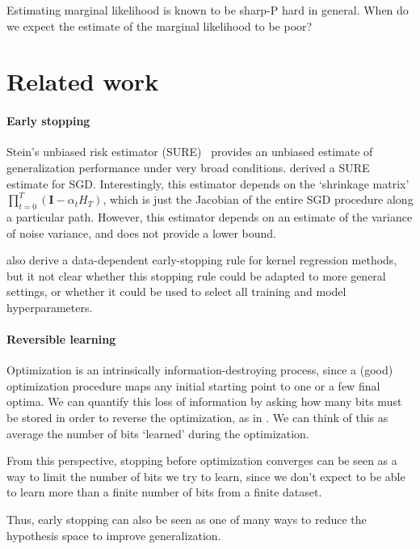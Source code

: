 \documentclass[]{article}
\newcommand{\vI}{\mathbf{I}}
\newcommand{\stepsize}{\alpha}
\begin{document}
Estimating marginal likelihood is known to be sharp-P hard in general.
When do we expect the estimate of the marginal likelihood to be poor?




\section{Related work}

\paragraph{Early stopping}
Stein's unbiased risk estimator (SURE)~\citep{stein1981estimation} provides an unbiased estimate of generalization performance under very broad conditions.
\citet{raskutti2014early} derived a SURE estimate for SGD.
Interestingly, this estimator depends on the `shrinkage matrix' $\prod_{t=0}^{T} ( \vI - \stepsize_t H_T )$, which is just the Jacobian of the entire SGD procedure along a particular path.
However, this estimator depends on an estimate of the variance of noise variance, and does not provide a lower bound.

\citet{raskutti2014early} also derive a data-dependent early-stopping rule for kernel regression methods, but it not clear whether this stopping rule could be adapted to more general settings, or whether it could be used to select all training and model hyperparameters.




\paragraph{Reversible learning} 
Optimization is an
intrinsically information-destroying process, since a (good) optimization
procedure maps any initial starting point to one or a few final optima. We can
quantify this loss of information by asking how many bits must be stored in order
to reverse the optimization, as in \citet{MacDuvAda2015hyper}.
 We can think of this as average the number of bits
`learned' during the optimization.

From this perspective, stopping before optimization
converges can be seen as a way to limit the number of bits we try to learn,
since we don't expect to be able to learn more than a finite number of bits from a finite dataset.

Thus, early stopping can also be seen as one of many ways to reduce the hypothesis space to improve generalization.
\end{document}
